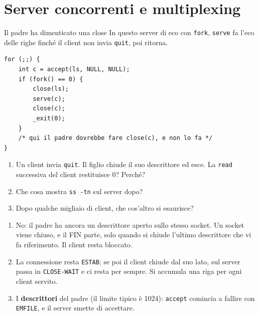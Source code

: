 \section{Server concorrenti e multiplexing}

\begin{esercizio}{Il padre ha dimenticato una close}
In questo server di eco con \texttt{fork}, \texttt{serve} fa l'eco delle righe finché il client non invia \texttt{quit}, poi ritorna.
\begin{lstlisting}[language={[POSIX]C}]
for (;;) {
    int c = accept(ls, NULL, NULL);
    if (fork() == 0) {
        close(ls);
        serve(c);
        close(c);
        _exit(0);
    }
    /* qui il padre dovrebbe fare close(c), e non lo fa */
}
\end{lstlisting}
\begin{enumerate}[label=(\alph*)]
    \item Un client invia \texttt{quit}. Il figlio chiude il suo descrittore ed esce. La \texttt{read} successiva del client restituisce 0?
          Perché?
    \item Che cosa mostra \texttt{ss -tn} sul server dopo?
    \item Dopo qualche migliaio di client, che cos'altro si esaurisce?
\end{enumerate}

\svolgimento
\begin{enumerate}[label=(\alph*)]
    \item No: il padre ha ancora un descrittore aperto sullo stesso socket. Un socket viene chiuso, e il FIN parte, solo quando si chiude
          l'ultimo descrittore che vi fa riferimento. Il client resta bloccato.
    \item La connessione resta \texttt{ESTAB}; se poi il client chiude dal suo lato, sul server passa in \texttt{CLOSE-WAIT} e ci resta per
          sempre. Si accumula una riga per ogni client servito.
    \item I \textbf{descrittori} del padre (il limite tipico è 1024): \texttt{accept} comincia a fallire con \texttt{EMFILE}, e il server
          smette di accettare.
\end{enumerate}
\end{esercizio}

